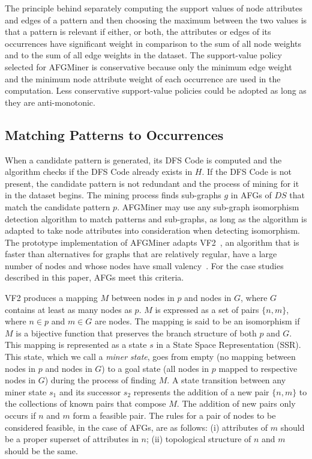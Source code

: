 The principle behind separately computing the support values of node attributes and edges of a pattern and then choosing the maximum between the two values is that a pattern is relevant if either, or both, the attributes or edges of its occurrences have significant weight in comparison to the sum of all node weights and to the sum of all edge weights in the dataset. The support-value policy selected for AFGMiner is conservative because only the minimum edge weight and the minimum node attribute weight of each occurrence are used in the computation. Less conservative support-value policies could be adopted as long as they are anti-monotonic.  

\subsection{Matching Patterns to Occurrences}
When a candidate pattern is generated, its DFS Code is computed and the algorithm checks if the DFS Code already exists in $H$. If the DFS Code is not present, the candidate pattern is not redundant and the process of mining for it in the dataset begins. The mining process finds sub-graphs $g$ in AFGs of $DS$ that match the candidate pattern $p$. AFGMiner may use any sub-graph isomorphism detection algorithm to match patterns and sub-graphs, as long as the algorithm is adapted to take node attributes into consideration when detecting isomorphism. The prototype implementation of AFGMiner adapts VF2~\cite{Cordella}, an algorithm that is faster than alternatives for graphs that are relatively regular, have a large number of nodes and whose nodes have small valency~\cite{Foggia}. For the case studies described in this paper, AFGs meet this criteria. 

VF2 produces a mapping $M$ between nodes in $p$ and nodes in $G$, where $G$ contains at least as many nodes as $p$. $M$ is expressed as a set of pairs $\{n, m\}$, where $n \in p$ and $m \in G$ are nodes. The mapping is said to be an isomorphism if $M$ is a bijective function that preserves the branch structure of both $p$ and $G$. This mapping is represented as a state $s$ in a State Space Representation (SSR). This state, which we call a \emph{miner state}, goes from empty (no mapping between nodes in $p$ and nodes in $G$) to a goal state (all nodes in $p$ mapped to respective nodes in $G$) during the process of finding $M$. A state transition between any miner state $s_1$ and its successor $s_2$ represents the addition of a new pair $\{n, m\}$ to the collections of known pairs that compose $M$. The addition of new pairs only occurs if $n$ and $m$ form a feasible pair. The rules for a pair of nodes to be considered feasible, in the case of AFGs, are as follows: (i) attributes of $m$ should be a proper superset of attributes in $n$; (ii) topological structure of $n$ and $m$ should be the same.

